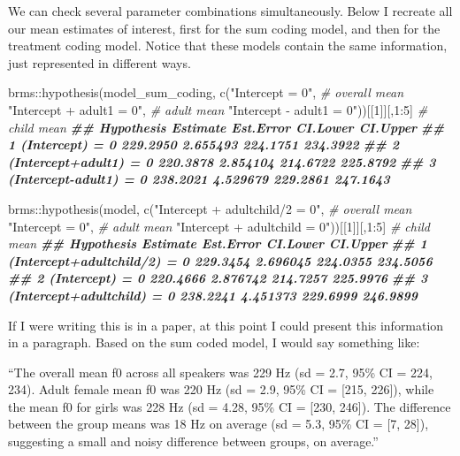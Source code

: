 \documentclass[
]{book}
\newenvironment{Shaded}{\begin{snugshade}}{\end{snugshade}}
\newcommand{\CommentTok}[1]{\textcolor[rgb]{0.56,0.35,0.01}{\textit{#1}}}
\newcommand{\DecValTok}[1]{\textcolor[rgb]{0.00,0.00,0.81}{#1}}
\newcommand{\DocumentationTok}[1]{\textcolor[rgb]{0.56,0.35,0.01}{\textbf{\textit{#1}}}}
\newcommand{\FunctionTok}[1]{\textcolor[rgb]{0.00,0.00,0.00}{#1}}
\newcommand{\NormalTok}[1]{#1}
\newcommand{\SpecialCharTok}[1]{\textcolor[rgb]{0.00,0.00,0.00}{#1}}
\newcommand{\StringTok}[1]{\textcolor[rgb]{0.31,0.60,0.02}{#1}}
\begin{document}
We can check several parameter combinations simultaneously. Below I recreate all our mean estimates of interest, first for the sum coding model, and then for the treatment coding model. Notice that these models contain the same information, just represented in different ways.

\begin{Shaded}
\begin{Highlighting}[]
\NormalTok{brms}\SpecialCharTok{::}\FunctionTok{hypothesis}\NormalTok{(model\_sum\_coding, }
                 \FunctionTok{c}\NormalTok{(}\StringTok{"Intercept = 0"}\NormalTok{,   }\CommentTok{\# overall mean}
                   \StringTok{"Intercept + adult1 = 0"}\NormalTok{,  }\CommentTok{\# adult mean}
                   \StringTok{"Intercept {-} adult1 = 0"}\NormalTok{))[[}\DecValTok{1}\NormalTok{]][,}\DecValTok{1}\SpecialCharTok{:}\DecValTok{5}\NormalTok{] }\CommentTok{\# child mean}
\DocumentationTok{\#\#               Hypothesis Estimate Est.Error CI.Lower CI.Upper}
\DocumentationTok{\#\# 1        (Intercept) = 0 229.2950  2.655493 224.1751 234.3922}
\DocumentationTok{\#\# 2 (Intercept+adult1) = 0 220.3878  2.854104 214.6722 225.8792}
\DocumentationTok{\#\# 3 (Intercept{-}adult1) = 0 238.2021  4.529679 229.2861 247.1643}

\NormalTok{brms}\SpecialCharTok{::}\FunctionTok{hypothesis}\NormalTok{(model, }
                 \FunctionTok{c}\NormalTok{(}\StringTok{"Intercept + adultchild/2 = 0"}\NormalTok{,   }\CommentTok{\# overall mean}
                   \StringTok{"Intercept = 0"}\NormalTok{,  }\CommentTok{\# adult mean}
                   \StringTok{"Intercept + adultchild = 0"}\NormalTok{))[[}\DecValTok{1}\NormalTok{]][,}\DecValTok{1}\SpecialCharTok{:}\DecValTok{5}\NormalTok{] }\CommentTok{\# child mean}
\DocumentationTok{\#\#                     Hypothesis Estimate Est.Error CI.Lower CI.Upper}
\DocumentationTok{\#\# 1 (Intercept+adultchild/2) = 0 229.3454  2.696045 224.0355 234.5056}
\DocumentationTok{\#\# 2              (Intercept) = 0 220.4666  2.876742 214.7257 225.9976}
\DocumentationTok{\#\# 3   (Intercept+adultchild) = 0 238.2241  4.451373 229.6999 246.9899}
\end{Highlighting}
\end{Shaded}

If I were writing this is in a paper, at this point I could present this information in a paragraph. Based on the sum coded model, I would say something like:

``The overall mean f0 across all speakers was 229 Hz (sd = 2.7, 95\% CI = 224, 234). Adult female mean f0 was 220 Hz (sd = 2.9, 95\% CI = {[}215, 226{]}), while the mean f0 for girls was 228 Hz (sd = 4.28, 95\% CI = {[}230, 246{]}). The difference between the group means was 18 Hz on average (sd = 5.3, 95\% CI = {[}7, 28{]}), suggesting a small and noisy difference between groups, on average.''
\end{document}
